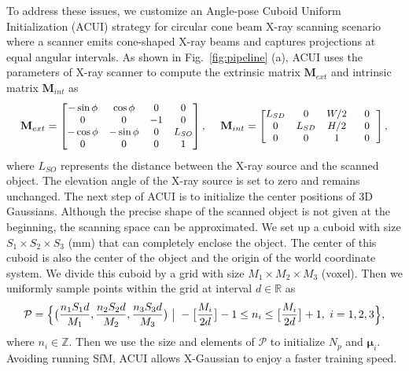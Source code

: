 \documentclass[runningheads]{llncs}
\begin{document}
To address these issues, we customize an Angle-pose Cuboid Uniform Initialization (ACUI) strategy for circular cone beam X-ray scanning scenario where a scanner emits cone-shaped X-ray beams and captures projections at equal angular intervals. As shown in Fig.~\ref{fig:pipeline} (a), ACUI uses the parameters of X-ray scanner  to compute the extrinsic matrix $\mathbf{M}_{ext}$ and intrinsic matrix $\mathbf{M}_{int}$ as
\vspace{0.1mm}
\begin{equation}
    \small
        \mathbf{M}_{ext} = 
        \begin{bmatrix}
            -\sin\phi & \cos\phi & 0 & 0 \\
            0 & 0 & -1 & 0 \\
            -\cos\phi & -\sin\phi & 0 & L_{SO} \\
            0 & 0 & 0 & 1
        \end{bmatrix}, ~~~~
        \mathbf{M}_{int} = 
        \begin{bmatrix}
            L_{SD} & 0 & {W} / {2} &~~0~~ \\
            0 & L_{SD} & {H} / {2} &~~0~~ \\
            0 & 0 & 1 &~~0~~
        \end{bmatrix},
    \vspace{0.2mm}
\end{equation}
where $L_{SO}$ represents the distance between the X-ray source and the scanned object. The elevation angle of the X-ray source is set to zero and remains unchanged.
The next step of ACUI is to initialize the center positions of 3D Gaussians. Although the precise shape of the scanned object is not given at the beginning, the scanning space can be approximated. We set up a cuboid with size $S_1\times S_2 \times S_3$ (mm)  that can completely enclose the object. The center of this cuboid is also the center of the object and the origin of the world coordinate system. We divide this cuboid by a grid with size $M_1\times M_2\times M_3$ (voxel). Then we uniformly sample points within the grid at interval $d \in \mathbb{R}$ as
\begin{equation}
	\small
	\mathcal{P} = \Big\{\big(\frac{n_1 S_1 d}{M_1}, \frac{n_2 S_2 d}{M_2}, \frac{n_3 S_3 d}{M_3}\big)~\big|~-\big[\frac{M_i}{2d}\big]-1 \leq n_i \leq \big[\frac{M_i}{2d}\big]+1, ~i = 1, 2, 3\Big\},
	\label{eq:sampling}
\end{equation}
where $n_i \in \mathbb{Z}$. Then we use the size and elements of $\mathcal{P}$ to initialize $N_p$ and $\bm{\mu}_i$. Avoiding running SfM, ACUI allows X-Gaussian to enjoy a faster training speed.
\end{document}
